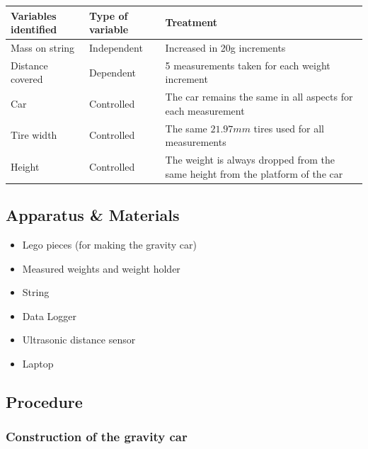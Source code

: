 \documentclass[titlepage,12pt]{article}
\let\oldsubsection\subsection
\renewcommand\subsection{\FloatBarrier \oldsubsection}
\begin{document}
\begin{table}[h!]
    \centering
    \label{my-label}
    \begin{tabular}{l|l|p{5cm}}
        Variables identified & Type of variable   & Treatment\\
        \hline
        \hline
        Mass on string       & Independent        & Increased in 20g increments\\
        \hline
        Distance covered     & Dependent          & 5 measurements taken for each weight increment\\
        \hline
        Car                  & Controlled         & The car remains the same in all aspects for each measurement\\
        \hline
        Tire width           & Controlled         & The same $21.97mm$ tires used for all measurements\\
        \hline
        Height               & Controlled         & The weight is always dropped from the same height from the platform of the car\\
    \end{tabular}
\end{table}

\subsection{Apparatus \& Materials}

\begin{itemize}
    \item Lego pieces (for making the gravity car)
    \item Measured weights and weight holder
    \item String
    \item Data Logger
    \item Ultrasonic distance sensor
    \item Laptop
\end{itemize}

\subsection{Procedure}

\subsubsection{Construction of the gravity car}
\end{document}
